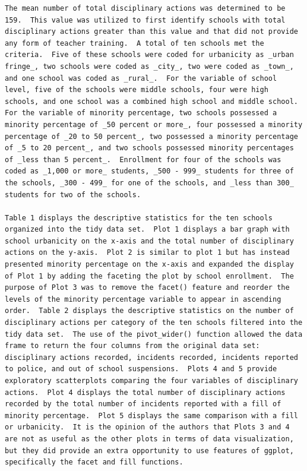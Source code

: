 \documentclass[man]{apa6}
\begin{document}
\begin{verbatim}
The mean number of total disciplinary actions was determined to be 159.  This value was utilized to first identify schools with total disciplinary actions greater than this value and that did not provide any form of teacher training.  A total of ten schools met the criteria.  Five of these schools were coded for urbanicity as _urban fringe_, two schools were coded as _city_, two were coded as _town_, and one school was coded as _rural_.  For the variable of school level, five of the schools were middle schools, four were high schools, and one school was a combined high school and middle school.  For the variable of minority percentage, two schools possessed a minority percentage of _50 percent or more_, four possessed a minority percentage of _20 to 50 percent_, two possessed a minority percentage of _5 to 20 percent_, and two schools possessed minority percentages of _less than 5 percent_.  Enrollment for four of the schools was coded as _1,000 or more_ students, _500 - 999_ students for three of the schools, _300 - 499_ for one of the schools, and _less than 300_ students for two of the schools. 

Table 1 displays the descriptive statistics for the ten schools organized into the tidy data set.  Plot 1 displays a bar graph with school urbanicity on the x-axis and the total number of disciplinary actions on the y-axis.  Plot 2 is similar to plot 1 but has instead presented minority percentage on the x-axis and expanded the display of Plot 1 by adding the faceting the plot by school enrollment.  The purpose of Plot 3 was to remove the facet() feature and reorder the levels of the minority percentage variable to appear in ascending order.  Table 2 displays the descriptive statistics on the number of disciplinary actions per category of the ten schools filtered into the tidy data set.  The use of the pivot_wider() function allowed the data frame to return the four columns from the original data set: disciplinary actions recorded, incidents recorded, incidents reported to police, and out of school suspensions.  Plots 4 and 5 provide exploratory scatterplots comparing the four variables of disciplinary actions.  Plot 4 displays the total number of disciplinary actions recorded by the total number of incidents reported with a fill of minority percentage.  Plot 5 displays the same comparison with a fill or urbanicity.  It is the opinion of the authors that Plots 3 and 4 are not as useful as the other plots in terms of data visualization, but they did provide an extra opportunity to use features of ggplot, specifically the facet and fill functions. 
\end{verbatim}
\end{document}
